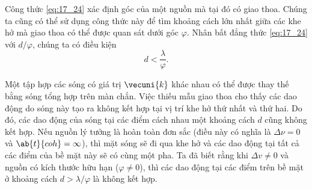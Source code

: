Công thức \eqref{eq:17_24} xác định góc của một nguồn mà tại đó có giao thoa.
Chúng ta cũng có thể sử dụng công thức này để tìm khoảng cách lớn nhất giữa các khe hở mà giao thoa có thể được quan sát dưới góc $\varphi$.
Nhân bất đẳng thức \eqref{eq:17_24} với $d/\varphi$, chúng ta có điều kiện
\begin{equation}\label{eq:17_25}
    d < \frac{\lambda}{\varphi}.
\end{equation}

Một tập hợp các sóng có giá trị $\vecuni{k}$ khác nhau có thể được thay thế bằng sóng tổng hợp trên màn chắn.
Việc thiếu mẫu giao thoa cho thấy các dao động do sóng này tạo ra không kết hợp tại vị trí khe hở thứ nhất và thứ hai.
Do đó, các dao động của sóng tại các điểm cách nhau một khoảng cách $d$ cũng không kết hợp.
Nếu nguồn lý tưởng là hoàn toàn đơn sắc (điều này có nghĩa là $\Delta{\nu}=0$ và $\ab{t}{coh}=\infty$), thì mặt sóng sẽ đi qua khe hở và các dao động tại tất cả các điểm của bề mặt này sẽ có cùng một pha.
Ta đã biết rằng khi $\Delta{v}\neq 0$ và nguồn có kích thước hữu hạn ($\varphi\neq 0$), thì các dao động tại các điểm trên bề mặt ở khoảng cách $d>\lambda/\varphi$ là không kết hợp.

